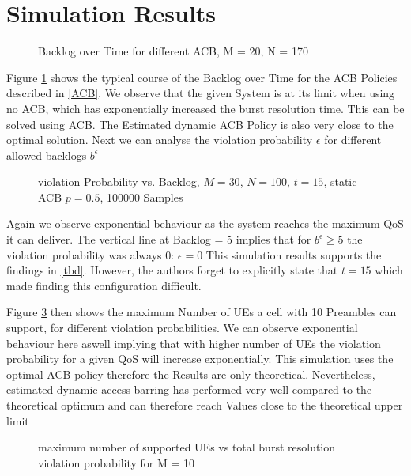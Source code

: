 \documentclass[conference]{IEEEtran}
\begin{document}
\section{Simulation Results}
\begin{figure}
\resizebox{\columnwidth}{!}{}
    \caption{Backlog over Time for different ACB, M = 20, N = 170}\label{fig:backlog}
\end{figure}
Figure \ref{fig:backlog} shows the typical course of the Backlog over Time for the ACB Policies described in \ref{ACB}.
We observe that the given System is at its limit when using no ACB, which has exponentially increased the burst resolution time.
This can be solved using ACB.
The Estimated dynamic ACB Policy is also very close to the optimal solution.
Next we can analyse the violation probability $\epsilon$ for different allowed backlogs $b^\epsilon$
\begin{figure}
\resizebox{\columnwidth}{!}{}
    \caption{violation Probability vs. Backlog,  $M = 30$, $N = 100$, $t = 15$, static ACB $p=0.5$, 100000 Samples}\label{fig:violation prob}
\end{figure}
Again we observe exponential behaviour as the system reaches the maximum QoS it can deliver.
The vertical line at Backlog = 5 implies that for $b^\epsilon\geq 5$ the violation probability was always 0: $\epsilon = 0$
This simulation results supports the findings in \ref{tbd}.
However, the authors forget to explicitly state that $t = 15$ which made finding this configuration difficult.

Figure \ref{fig:max UEs supported} then shows the maximum Number of UEs a cell with 10 Preambles can support, for different violation probabilities.
We can observe exponential behaviour here aswell implying that with higher number of UEs the violation probability for a given QoS will increase exponentially.
This simulation uses the optimal ACB policy therefore the Results are only theoretical.
Nevertheless, estimated dynamic access barring has performed very well compared to the theoretical optimum and can therefore reach Values close to the theoretical upper limit
\begin{figure}
\resizebox{\columnwidth}{!}{}
    \caption{maximum number of supported UEs vs total burst resolution violation probability for M = {10}}\label{fig:max UEs supported}
\end{figure}
\end{document}
